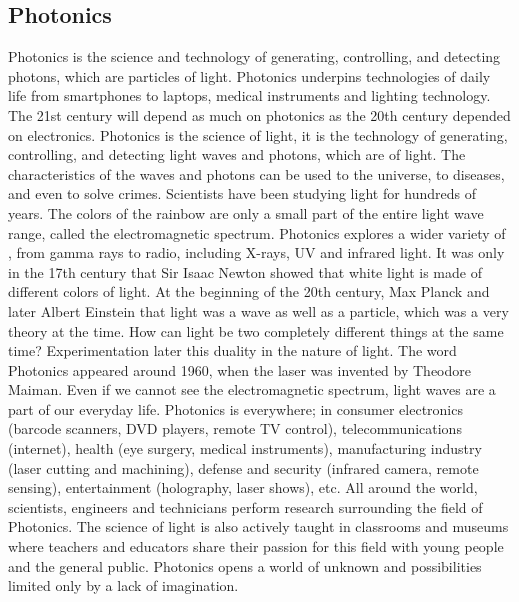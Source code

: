 \subsection*{Photonics}
Photonics is the science and technology of generating, controlling, and detecting
photons, which are particles of light. Photonics underpins technologies of daily life from smartphones
to laptops, medical instruments and lighting technology. The 21st century will depend as much
on photonics as the 20th century depended on electronics.
Photonics is the science of light, it is the technology of generating, controlling, and detecting light
waves and photons, which are \underline{\hspace{2cm}} of light. The characteristics of the waves and
photons can be used to \underline{\hspace{2cm}} the universe, to \underline{\hspace{2cm}} diseases, and even to solve
crimes. Scientists have been studying light for hundreds of years. The colors of the rainbow are only
a small part of the entire light wave range, called the electromagnetic spectrum. Photonics explores
a wider variety of \underline{\hspace{2cm}}, from gamma rays to radio, including X-rays, UV and infrared
light. It was only in the 17th century that Sir Isaac Newton showed that white light is made of
different colors of light. At the beginning of the 20th century, Max Planck and later Albert Einstein
\underline{\hspace{2cm}} that light was a wave as well as a particle, which was a very \underline{\hspace{1.5cm}}
theory at the time. How can light be two completely different things at the same time?
Experimentation later \underline{\hspace{2cm}} this duality in the nature of light.
The word Photonics appeared around 1960, when the laser was invented by Theodore Maiman.
Even if we cannot see the \underline{\hspace{1.3cm}} electromagnetic spectrum, \underline{\hspace{2cm}} light waves
are a part of our everyday life. Photonics is everywhere; in consumer electronics (barcode scanners,
DVD players, remote TV control), telecommunications (internet), health (eye surgery, medical
instruments), manufacturing industry (laser cutting and machining), defense and security (infrared
camera, remote sensing), entertainment (holography, laser shows), etc.
All around the world, scientists, engineers and technicians perform \underline{\hspace{2cm}} research
surrounding the field of Photonics. The science of light is also actively taught in classrooms and
museums where teachers and educators share their passion for this field with young people and the
general public. Photonics opens a world of unknown and \underline{\hspace{2cm}} possibilities limited
only by a lack of imagination.

